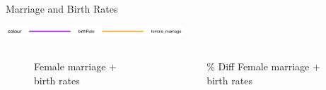 \documentclass{beamer}
\begin{document}
		\begin{frame}{Marriage and Birth Rates}
			\begin{center}
				\includegraphics[width=0.5\textwidth]{Images/legend2.png}
			\end{center}

			\begin{columns}
				\begin{column}{0.5\paperwidth}
					\begin{figure}
						\caption{Female marriage + birth rates}
					\end{figure}
				\end{column}

				\begin{column}{0.5\paperwidth}
					\begin{figure}
						\caption{\% Diff Female marriage + birth rates}
					\end{figure}
				\end{column}
			\end{columns}	


\end{frame}
\end{document}
